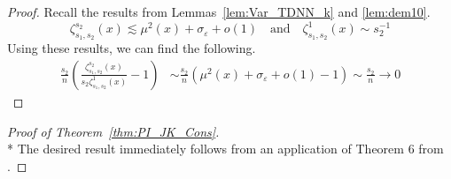 \begin{proof}
	Recall the results from Lemmas~\ref{lem:Var_TDNN_k} and \ref{lem:dem10}.
	\begin{equation*}
		\zeta_{s_1, s_2}^{s_2}\left(x\right) \lesssim \mu^2(x) + \sigma_{\varepsilon} + o(1)
		\quad \text{and} \quad
		\zeta_{s_1, s_2}^{1}\left(x\right) \sim s_2^{-1}
	\end{equation*}
	Using these results, we can find the following.
	\begin{equation}
		\begin{aligned}
			\frac{s_2}{n}\left(\frac{
				\zeta_{s_1, s_2}^{s_2}\left(x\right)}{s_2 \zeta_{s_1, s_2}^{1}\left(x\right)} - 1\right)
			 & \sim \frac{s_2}{n}\left(\mu^2(x) + \sigma_{\varepsilon} + o(1) - 1\right)
			\sim \frac{s_2}{n} \rightarrow 0
		\end{aligned}
	\end{equation}
\end{proof}

\begin{proof}[Proof of Theorem~\ref{thm:PI_JK_Cons}]\mbox{}\\*
	The desired result immediately follows from an application of Theorem 6 from \citet{peng_bias_2021}.
\end{proof}

